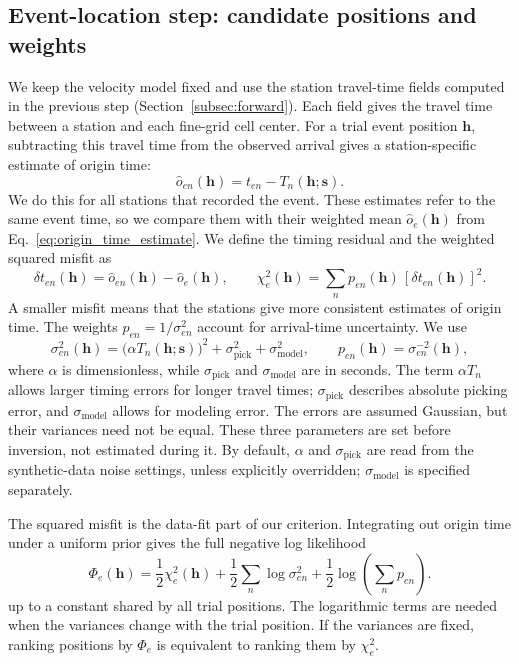 \documentclass[12pt, a4paper]{article}
\begin{document}
\subsection{Event-location step: candidate positions and weights}
\label{subsec:estep}

We keep the velocity model fixed and use the station travel-time fields computed in the previous step (Section~\ref{subsec:forward}). Each field gives the travel time between a station and each fine-grid cell center. For a trial event position $\mathbf{h}$, subtracting this travel time from the observed arrival gives a station-specific estimate of origin time:
\begin{equation}
\widehat{o}_{en}(\mathbf{h})=t_{en}-T_n(\mathbf{h};\mathbf{s}).
\end{equation}
We do this for all stations that recorded the event. These estimates refer to the same event time, so we compare them with their weighted mean $\widehat{o}_e(\mathbf{h})$ from Eq.~\eqref{eq:origin_time_estimate}. We define the timing residual and the weighted squared misfit as
\begin{equation}
\delta t_{en}(\mathbf{h})=\widehat{o}_{en}(\mathbf{h})-\widehat{o}_e(\mathbf{h}),
\qquad
\chi_e^2(\mathbf{h})=\sum_n p_{en}(\mathbf{h})\,[\delta t_{en}(\mathbf{h})]^2.
\end{equation}
A smaller misfit means that the stations give more consistent estimates of origin time. The weights $p_{en}=1/\sigma_{en}^2$ account for arrival-time uncertainty. We use
\begin{equation}
\sigma_{en}^2(\mathbf{h})=
\bigl(\alpha T_n(\mathbf{h};\mathbf{s})\bigr)^2+\sigma_{\mathrm{pick}}^2+\sigma_{\mathrm{model}}^2,
\qquad p_{en}(\mathbf{h})=\sigma_{en}^{-2}(\mathbf{h}),
\end{equation}
where $\alpha$ is dimensionless, while $\sigma_{\mathrm{pick}}$ and $\sigma_{\mathrm{model}}$ are in seconds. The term $\alpha T_n$ allows larger timing errors for longer travel times; $\sigma_{\mathrm{pick}}$ describes absolute picking error, and $\sigma_{\mathrm{model}}$ allows for modeling error. The errors are assumed Gaussian, but their variances need not be equal. These three parameters are set before inversion, not estimated during it. By default, $\alpha$ and $\sigma_{\mathrm{pick}}$ are read from the synthetic-data noise settings, unless explicitly overridden; $\sigma_{\mathrm{model}}$ is specified separately.

The squared misfit is the data-fit part of our criterion. Integrating out origin time under a uniform prior gives the full negative log likelihood
\begin{equation}
\Phi_e(\mathbf{h})=
\frac{1}{2}\chi_e^2(\mathbf{h})
+\frac{1}{2}\sum_n\log\sigma_{en}^2
+\frac{1}{2}\log\!\left(\sum_n p_{en}\right).
\label{eq:location_cost}
\end{equation}
up to a constant shared by all trial positions. The logarithmic terms are needed when the variances change with the trial position. If the variances are fixed, ranking positions by $\Phi_e$ is equivalent to ranking them by $\chi_e^2$.
\end{document}

